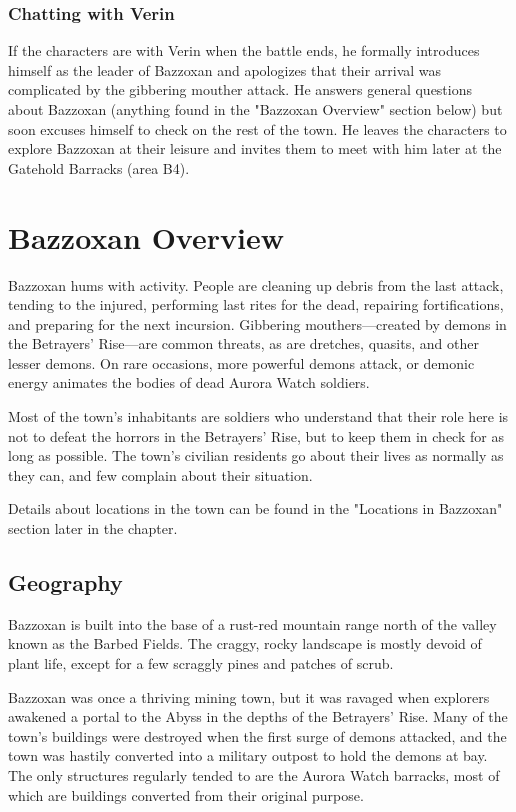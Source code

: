 \documentclass[a4paper, 11pt, bg=full, twocolumn, nooutline]{dndbook}
\begin{document}
\subsubsection{Chatting with Verin}

If the characters are with Verin when the battle ends, he formally introduces himself as the leader of Bazzoxan and apologizes that their arrival was complicated by the gibbering mouther attack. He answers general questions about Bazzoxan (anything found in the "Bazzoxan Overview" section below) but soon excuses himself to check on the rest of the town. He leaves the characters to explore Bazzoxan at their leisure and invites them to meet with him later at the Gatehold Barracks (area B4).
\section{Bazzoxan Overview}

Bazzoxan hums with activity. People are cleaning up debris from the last attack, tending to the injured, performing last rites for the dead, repairing fortifications, and preparing for the next incursion. Gibbering mouthers---created by demons in the Betrayers' Rise---are common threats, as are dretches, quasits, and other lesser demons. On rare occasions, more powerful demons attack, or demonic energy animates the bodies of dead Aurora Watch soldiers.

Most of the town's inhabitants are soldiers who understand that their role here is not to defeat the horrors in the Betrayers' Rise, but to keep them in check for as long as possible. The town's civilian residents go about their lives as normally as they can, and few complain about their situation.

Details about locations in the town can be found in the "Locations in Bazzoxan" section later in the chapter.


\subsection{Geography}

Bazzoxan is built into the base of a rust-red mountain range north of the valley known as the Barbed Fields. The craggy, rocky landscape is mostly devoid of plant life, except for a few scraggly pines and patches of scrub.

Bazzoxan was once a thriving mining town, but it was ravaged when explorers awakened a portal to the Abyss in the depths of the Betrayers' Rise. Many of the town's buildings were destroyed when the first surge of demons attacked, and the town was hastily converted into a military outpost to hold the demons at bay. The only structures regularly tended to are the Aurora Watch barracks, most of which are buildings converted from their original purpose.
\end{document}
